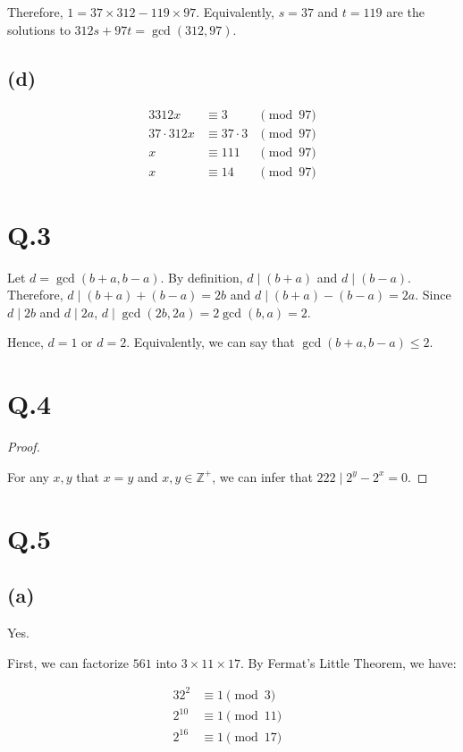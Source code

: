 \documentclass[a4paper,12pt]{article}
\begin{document}
Therefore, $1 = 37 \times 312 - 119 \times 97$.
Equivalently, $s = 37$ and $t = 119$ are the solutions to $312s + 97t = \gcd(312,97)$.

\subsection*{(d)}

\begin{alignat*}{3}
	312x &\equiv 3 &\pmod{97} \\
	37 \cdot 312x &\equiv 37 \cdot 3 &\pmod{97} \\
	x &\equiv 111 &\pmod{97} \\
	x &\equiv 14 &\pmod{97}
\end{alignat*}

\section*{Q.3}

Let $d = \gcd(b+a,b-a)$. 
By definition, $d \mid (b+a)$ and $d \mid (b-a)$.
Therefore, $d \mid (b+a) + (b-a) = 2b$ and $d \mid (b+a) - (b-a) = 2a$.
Since $d \mid 2b$ and $d \mid 2a$, $d \mid \gcd(2b,2a) = 2\gcd(b,a) = 2$.

Hence, $d = 1$ or $d = 2$.
Equivalently, we can say that $\gcd(b+a,b-a) \leq 2$.

\section*{Q.4}

\begin{proof}
$ $

For any $x, y$ that $x = y$ and $x, y \in \mathbb{Z}^+$, we can infer that $222 \mid 2^y - 2^x = 0$.
\end{proof}

\section*{Q.5}

\subsection*{(a)}

Yes.

First, we can factorize $561$ into $3 \times 11 \times 17$.
By Fermat's Little Theorem, we have:

\begin{alignat*}{3}
	2^{2}  &\equiv 1 \pmod{3}& \\ 
	2^{10} &\equiv 1 \pmod{11}& \\
	2^{16} &\equiv 1 \pmod{17}&
\end{alignat*}
\end{document}
